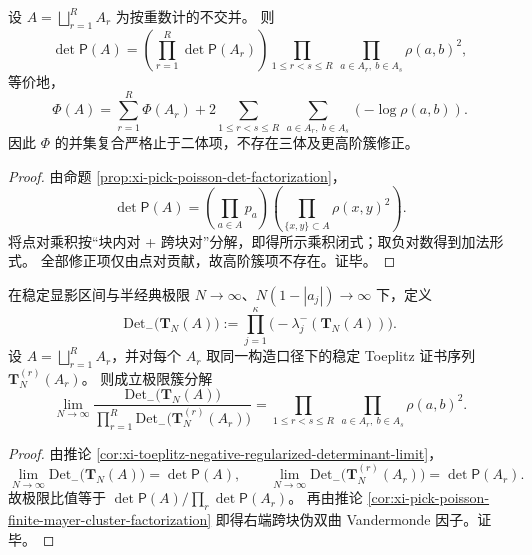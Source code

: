 \begin{corollary}\label{cor:xi-pick-poisson-finite-mayer-cluster-factorization}
设 \(A=\bigsqcup_{r=1}^{R}A_r\) 为按重数计的不交并。
则
\[
\det\mathsf P(A)
=\left(\prod_{r=1}^{R}\det\mathsf P(A_r)\right)
\prod_{1\le r<s\le R}\ \prod_{a\in A_r,\ b\in A_s}\rho(a,b)^2,
\]
等价地，
\[
\Phi(A)
=\sum_{r=1}^{R}\Phi(A_r)
+2\sum_{1\le r<s\le R}\ \sum_{a\in A_r,\ b\in A_s}(-\log\rho(a,b)).
\]
因此 \(\Phi\) 的并集复合严格止于二体项，不存在三体及更高阶簇修正。
\end{corollary}
\begin{proof}
由命题 \ref{prop:xi-pick-poisson-det-factorization}，
\[
\det\mathsf P(A)
=\left(\prod_{a\in A}p_a\right)
\left(\prod_{\{x,y\}\subset A}\rho(x,y)^2\right).
\]
将点对乘积按“块内对 + 跨块对”分解，即得所示乘积闭式；取负对数得到加法形式。
全部修正项仅由点对贡献，故高阶簇项不存在。证毕。
\end{proof}

\begin{theorem}\label{thm:xi-toeplitz-negative-regularized-det-geometric-cluster-limit}
在稳定显影区间与半经典极限 \(N\to\infty\)、\(N(1-|a_j|)\to\infty\) 下，定义
\[
\mathrm{Det}_{-}\!\bigl(\mathbf T_N(A)\bigr)
:=\prod_{j=1}^{\kappa}\bigl(-\lambda_j^{-}(\mathbf T_N(A))\bigr).
\]
设 \(A=\bigsqcup_{r=1}^{R}A_r\)，并对每个 \(A_r\) 取同一构造口径下的稳定 Toeplitz 证书序列 \(\mathbf T_N^{(r)}(A_r)\)。
则成立极限簇分解
\[
\lim_{N\to\infty}
\frac{\mathrm{Det}_{-}\!\bigl(\mathbf T_N(A)\bigr)}
{\prod_{r=1}^{R}\mathrm{Det}_{-}\!\bigl(\mathbf T_N^{(r)}(A_r)\bigr)}
=
\prod_{1\le r<s\le R}\ \prod_{a\in A_r,\ b\in A_s}\rho(a,b)^2.
\]
\end{theorem}
\begin{proof}
由推论 \ref{cor:xi-toeplitz-negative-regularized-determinant-limit}，
\[
\lim_{N\to\infty}\mathrm{Det}_{-}\!\bigl(\mathbf T_N(A)\bigr)=\det\mathsf P(A),
\qquad
\lim_{N\to\infty}\mathrm{Det}_{-}\!\bigl(\mathbf T_N^{(r)}(A_r)\bigr)=\det\mathsf P(A_r).
\]
故极限比值等于 \(\det\mathsf P(A)/\prod_r\det\mathsf P(A_r)\)。
再由推论 \ref{cor:xi-pick-poisson-finite-mayer-cluster-factorization} 即得右端跨块伪双曲 Vandermonde 因子。证毕。
\end{proof}

